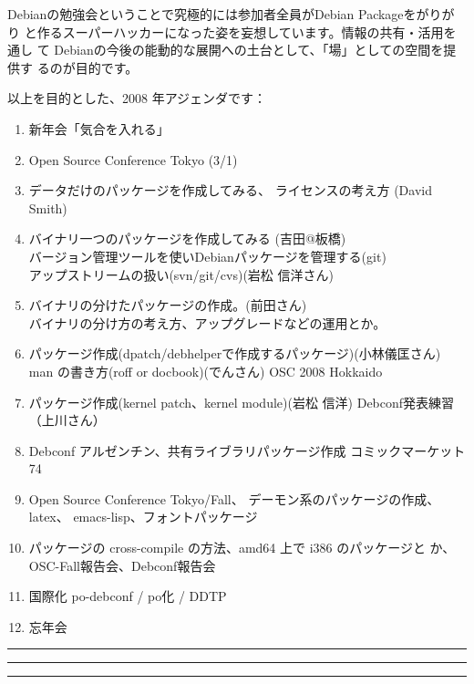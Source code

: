 \documentclass[mingoth,a4paper]{jsarticle}
\begin{document}
 Debianの勉強会ということで究極的には参加者全員がDebian Packageをがりがり
 と作るスーパーハッカーになった姿を妄想しています。情報の共有・活用を通し
 て Debianの今後の能動的な展開への土台として、「場」としての空間を提供す
 るのが目的です。

以上を目的とした、2008 年アジェンダです：
\begin{enumerate}
 \item 新年会「気合を入れる」
 \item Open Source Conference Tokyo (3/1)
 \item データだけのパッケージを作成してみる、
       ライセンスの考え方 (David Smith)
 \item バイナリ一つのパッケージを作成してみる (吉田@板橋)\\
       バージョン管理ツールを使いDebianパッケージを管理する(git)\\
       アップストリームの扱い(svn/git/cvs)(岩松 信洋さん)
 \item バイナリの分けたパッケージの作成。(前田さん)\\
       バイナリの分け方の考え方、アップグレードなどの運用とか。
 \item パッケージ作成(dpatch/debhelperで作成するパッケージ)(小林儀匡さん)\\
       man の書き方(roff or docbook)(でんさん)
       OSC 2008 Hokkaido
 \item パッケージ作成(kernel patch、kernel module)(岩松 信洋)
       Debconf発表練習（上川さん）

 \item Debconf アルゼンチン、共有ライブラリパッケージ作成
       コミックマーケット74

 \item Open Source Conference Tokyo/Fall、
       デーモン系のパッケージの作成、latex、 emacs-lisp、フォントパッケージ
 \item パッケージの cross-compile の方法、amd64 上で i386 のパッケージと
       か、OSC-Fall報告会、Debconf報告会
 \item 国際化 po-debconf / po化 / DDTP
 \item 忘年会
\end{enumerate}


\newpage

\begin{minipage}[b]{0.2\hsize}
 \colorbox{titleback}{}
\end{minipage}
\begin{minipage}[b]{0.8\hsize}
\hrule
\vspace{2mm}
\hrule
\tableofcontents
\vspace{2mm}
\hrule
\end{minipage}
\end{document}
